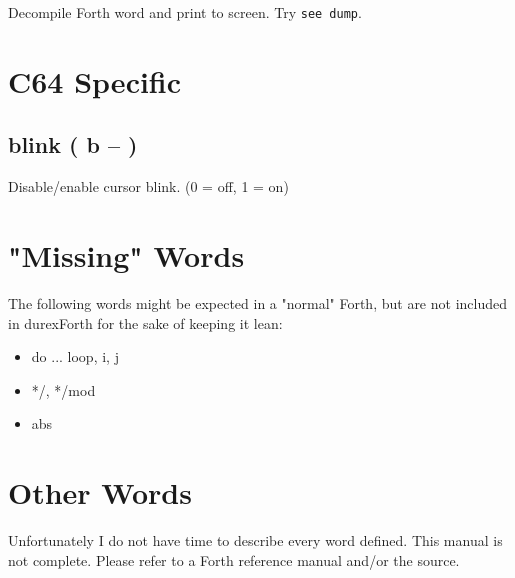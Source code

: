 Decompile Forth word and print to screen. Try \texttt{see dump}.

\section{C64 Specific}

\subsection{blink ( b -- )}

Disable/enable cursor blink. (0 = off, 1 = on)


\section{"Missing" Words}

The following words might be expected in a "normal" Forth, but are not included in durexForth for the sake of keeping it lean:

\begin{itemize}
\item do ... loop, i, j
\item */, */mod
\item abs
\end{itemize}


\section{Other Words}

Unfortunately I do not have time to describe every word defined. This manual is not complete. Please refer to a Forth reference manual and/or the source.
